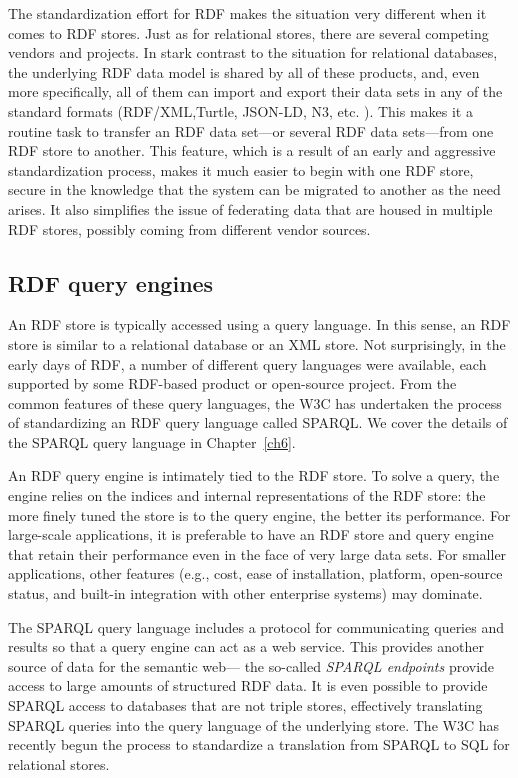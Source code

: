 The standardization effort for RDF makes the situation very different
when it comes to RDF stores. Just as for relational stores, there are
several competing vendors and projects. In stark contrast to the
situation for relational databases, the underlying RDF data model is
shared by all of these products, and, even more specifically, all of
them can import and export their data sets in any of the standard
formats (RDF/XML,Turtle, JSON-LD, N3, etc. ). This makes it a routine
task to transfer an RDF data set---or several RDF data sets---from one
RDF store to another. This feature, which is a result of an early and
aggressive standardization process, makes it much easier to begin with
one RDF store, secure in the knowledge that the system can be migrated
to another as the need arises. It also simplifies the issue of
federating data that are housed in multiple RDF stores, possibly coming
from different vendor sources.

\subsection{RDF query engines}

An RDF store is typically accessed using a query language. In this
sense, an RDF store is similar to a relational database or an XML store.
Not surprisingly, in the early days of RDF, a number of different query
languages were available, each supported by some RDF-based product or
open-source project. From the common features of these query languages,
the W3C has undertaken the process of standardizing an RDF query
language called SPARQL. We cover the details of the SPARQL query
language in Chapter~\ref{ch6}.

An RDF query engine is intimately tied to the RDF store. To solve a
query, the engine relies on the indices and internal representations of
the RDF store: the more finely tuned the store is to the query engine,
the better its performance. For large-scale applications, it is
preferable to have an RDF store and query engine that retain their
performance even in the face of very large data sets. For smaller
applications, other features (e.g., cost, ease of installation,
platform, open-source status, and built-in integration with other
enterprise systems) may dominate.

The SPARQL query language includes a protocol for communicating queries
and results so that a query engine can act as a web service. This
provides another source of data for the semantic web--- the so-called
\emph{SPARQL endpoints} provide access to large amounts of structured
RDF data. It is even possible to provide SPARQL access to databases that
are not triple stores, effectively translating SPARQL queries into the
query language of the underlying store. The W3C has recently begun the
process to standardize a translation from SPARQL to SQL for relational
stores.

